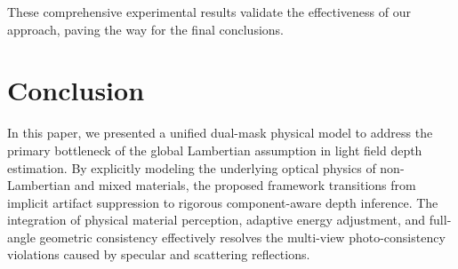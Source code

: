 \documentclass[lettersize,journal]{IEEEtran}
\begin{document}
\begin{table}[t]
\centering
\caption{Ablation Study of the Proposed Model Components on the UrbanLF-Syn Dataset}
\label{tab:ablation}
\end{table}

These comprehensive experimental results validate the effectiveness of our approach, paving the way for the final conclusions.

\section{Conclusion}

In this paper, we presented a unified dual-mask physical model to address the primary bottleneck of the global Lambertian assumption in light field depth estimation. By explicitly modeling the underlying optical physics of non-Lambertian and mixed materials, the proposed framework transitions from implicit artifact suppression to rigorous component-aware depth inference. The integration of physical material perception, adaptive energy adjustment, and full-angle geometric consistency effectively resolves the multi-view photo-consistency violations caused by specular and scattering reflections.
\end{document}
